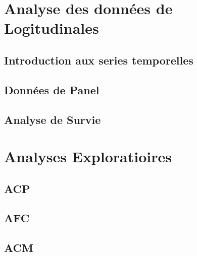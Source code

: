 \documentclass[
]{book}
\begin{document}
\hypertarget{analyse-des-donnuxe9es-de-logitudinales}{%
\chapter{Analyse des données de Logitudinales}\label{analyse-des-donnuxe9es-de-logitudinales}}

\hypertarget{introduction-aux-series-temporelles}{%
\section{Introduction aux series temporelles}\label{introduction-aux-series-temporelles}}

\hypertarget{donnuxe9es-de-panel}{%
\section{Données de Panel}\label{donnuxe9es-de-panel}}

\hypertarget{analyse-de-survie}{%
\section{Analyse de Survie}\label{analyse-de-survie}}

\hypertarget{analyses-exploratioires}{%
\chapter{Analyses Exploratioires}\label{analyses-exploratioires}}

\hypertarget{acp}{%
\section{ACP}\label{acp}}

\hypertarget{afc}{%
\section{AFC}\label{afc}}

\hypertarget{acm}{%
\section{ACM}\label{acm}}

  
\end{document}
